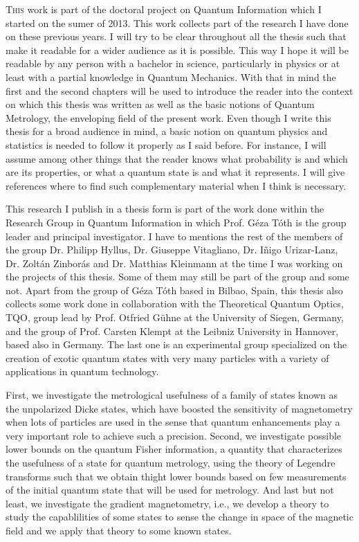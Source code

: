 \lettrine[lines=2, findent=3pt,nindent=0pt]{T}{his} work is part of the doctoral project on Quantum Information which I started on the sumer of 2013.
This work collects part of the research I have done on these previous years.
I will try to be clear throughout all the thesis such that make it readable for a wider audience as it is possible.
This way I hope it will be readable by any person with a bachelor in science, particularly in physics or at least with a partial knowledge in Quantum Mechanics.
With that in mind the first and the second chapters will be used to introduce the reader into the context on which this thesis was written as well as the basic notions of Quantum Metrology, the enveloping field of the present work.
Even though I write this thesis for a broad audience in mind, a basic notion on quantum physics and statistics is needed to follow it properly as I said before.
For instance, I will assume among other things that the reader knows what probability is and which are its properties, or what a quantum state is and what it represents.
I will give references where to find such complementary material when I think is necessary.

This research I publish in a thesis form is part of the work done within the Research Group in Quantum Information in which Prof.
G\'eza T\'oth is the group leader and principal investigator.
I have to mentions the rest of the members of the group Dr. Philipp Hyllus, Dr. Giuseppe Vitagliano, Dr. I\~nigo Urizar-Lanz, Dr. Zolt\'an Zinbor\'as and Dr. Matthias Kleinmann at the time I was working on the projects of this thesis.
Some of them may still be part of the group and some not.
Apart from the group of G\'eza T\'oth based in Bilbao, Spain, this thesis also collects some work done in collaboration with the Theoretical Quantum Optics, TQO, group lead by Prof. Otfried G\"uhne at the University of Siegen, Germany, and the group of Prof. Carsten Klempt at the Leibniz University in Hannover, based also in Germany.
The last one is an experimental group specialized on the creation of exotic quantum states with very many particles with a variety of applications in quantum technology.

First, we investigate the metrological usefulness of a family of states known as the unpolarized Dicke states, which have boosted the sensitivity of magnetometry when lots of particles are used in the sense that quantum enhancements play a very important role to achieve such a precision.
Second, we investigate possible lower bounds on the quantum Fisher information, a quantity that characterizes the usefulness of a state for quantum metrology, using the theory of Legendre transforms such that we obtain thight lower bounds based on few measurements of the initial quantum state that will be used for metrology.
And last but not least, we investigate the gradient magnetometry, i.e., we develop a theory to study the capablilities of some states to sense the change in space of the magnetic field and we apply that theory to some known states.

